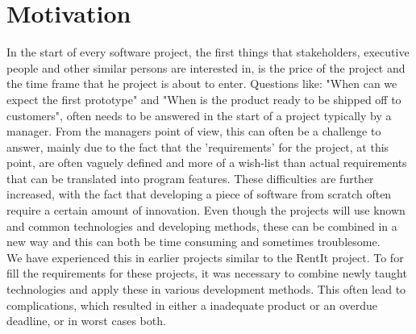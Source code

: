 \section{Motivation}
In the start of every software project, the first things that stakeholders, executive people and other similar persons are interested in, is the price of the project and the time frame that he project is about to enter. Questions like: "When can we expect the first prototype" and "When is the product ready to be shipped off to customers", often needs to be answered in the start of a project typically by a manager. From the managers point of view, this can often be a challenge to answer, mainly due to the fact that the 'requirements' for the project, at this point, are often vaguely defined and more of a wish-list than actual requirements that can be translated into program features. These difficulties are further increased, with the fact that developing a piece of software from scratch often require a certain amount of innovation\cite[p139]{ProjectManagement_b}. Even though the projects will use known and common technologies and developing methods, these can be combined in a new way and this can both be time consuming and sometimes troublesome.\\ We have experienced this in earlier projects similar to the RentIt project. To for fill the requirements for these projects, it was necessary to combine newly taught technologies and apply these in various development methods. This often lead to  complications, which resulted in either a inadequate product or an overdue deadline, or in worst cases both.\\   

